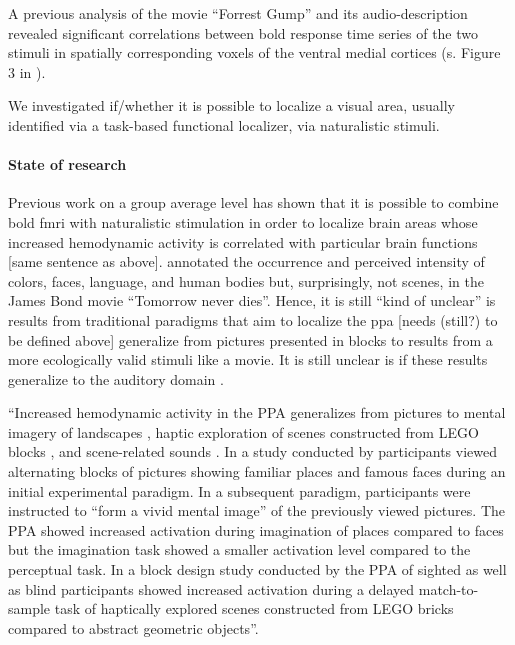 %
A previous analysis \citep{hanke2016simultaneous} of the movie ``Forrest Gump''
and its audio-description revealed significant correlations between \ac{bold}
response time series of the two stimuli in spatially corresponding voxels of the
ventral medial cortices (s. Figure 3 in \citep{hanke2016simultaneous}).
%


We investigated if/whether it is possible to localize a visual area, usually
identified via a task-based functional localizer, via naturalistic stimuli.


\paragraph{State of research}

Previous work on a group average level has shown that it is possible to combine
\ac{bold} \ac{fmri} with naturalistic stimulation in order to localize brain
areas whose increased hemodynamic activity is correlated with particular brain
functions \citep{bartels2004mapping} [same sentence as above].
%
\citep{bartels2004mapping} annotated the occurrence and perceived intensity of
colors, faces, language, and human bodies but, surprisingly, not scenes, in the
James Bond movie ``Tomorrow never dies''.
%
Hence, it is still ``kind of unclear'' is results from traditional paradigms
that aim to localize the \ac{ppa} [needs (still?) to be defined above]
generalize from pictures presented in blocks to results from a more ecologically
valid stimuli like a movie.
%
It is still unclear is if these results generalize to the auditory domain
\citep{aziz2008modulation}.

``Increased hemodynamic activity in the PPA generalizes from pictures to mental
imagery of landscapes \citep{ocraven2000mental}, haptic exploration of
scenes constructed from LEGO blocks \citep{wolbers2011modality}, and
scene-related sounds \citep{van2017development}.
In a study conducted by \citet{ocraven2000mental} participants viewed
alternating blocks of pictures showing familiar places and famous faces during
an initial experimental paradigm.
In a subsequent paradigm, participants were instructed to ``form a vivid mental
image'' of the previously viewed pictures.
The PPA showed increased activation during imagination of places compared to
faces but the imagination task showed a smaller activation level compared to the
perceptual task.
In a block design study conducted by \citet{wolbers2011modality} the PPA of
sighted as well as blind participants showed increased activation during a
delayed match-to-sample task of haptically explored scenes constructed from LEGO
bricks compared to abstract geometric objects''.

